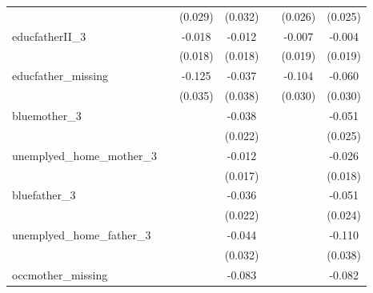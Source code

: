 \begin{table}[htbp]
\begin{tabular}{l*{6}{c}}
                    &                     &     (0.029)         &     (0.032)         &                     &     (0.026)         &     (0.025)         \\
educfatherII\_3      &                     &      -0.018         &      -0.012         &                     &      -0.007         &      -0.004         \\
                    &                     &     (0.018)         &     (0.018)         &                     &     (0.019)         &     (0.019)         \\
educfather\_missing  &                     &      -0.125\sym{***}&      -0.037         &                     &      -0.104\sym{***}&      -0.060\sym{**} \\
                    &                     &     (0.035)         &     (0.038)         &                     &     (0.030)         &     (0.030)         \\
bluemother\_3        &                     &                     &      -0.038\sym{*}  &                     &                     &      -0.051\sym{**} \\
                    &                     &                     &     (0.022)         &                     &                     &     (0.025)         \\
unemplyed\_home\_mother\_3&                     &                     &      -0.012         &                     &                     &      -0.026         \\
                    &                     &                     &     (0.017)         &                     &                     &     (0.018)         \\
bluefather\_3        &                     &                     &      -0.036         &                     &                     &      -0.051\sym{**} \\
                    &                     &                     &     (0.022)         &                     &                     &     (0.024)         \\
unemplyed\_home\_father\_3&                     &                     &      -0.044         &                     &                     &      -0.110\sym{***}\\
                    &                     &                     &     (0.032)         &                     &                     &     (0.038)         \\
occmother\_missing   &                     &                     &      -0.083\sym{**} &                     &                     &      -0.082\sym{***}\\

\end{tabular}
\end{table}
